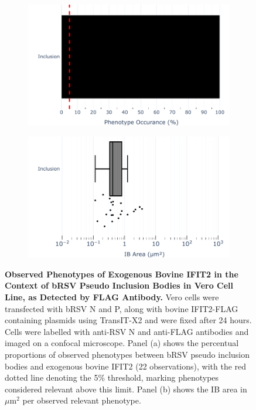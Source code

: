 \begin{figure}
    \begin{subfigure}{0.495\textwidth}
        \caption{}
        \includegraphics[width=1\linewidth]{09. Chapter 4/Figs/01. pIB/03. IFIT2/04. IFIT2-FLAG/03. FLAG/07. bar_bi2f_bnbp.pdf} 
    \end{subfigure}
    \begin{subfigure}{0.495\textwidth}
        \caption{}
        \includegraphics[width=1\linewidth]{09. Chapter 4/Figs/01. pIB/03. IFIT2/04. IFIT2-FLAG/03. FLAG/08. box_bi2f_bnbp.pdf}
    \end{subfigure}
    \caption[Observed Phenotypes of Exogenous Bovine IFIT2 in the Context of bRSV Pseudo Inclusion Bodies in Vero Cell Line, as Detected by FLAG Antibody.]{\textbf{Observed Phenotypes of Exogenous Bovine IFIT2 in the Context of bRSV Pseudo Inclusion Bodies in Vero Cell Line, as Detected by FLAG Antibody.} Vero cells were transfected with bRSV N and P, along with bovine IFIT2-FLAG containing plasmids using TransIT-X2 and were fixed after 24 hours. Cells were labelled with anti-RSV N and anti-FLAG antibodies and imaged on a confocal microscope. Panel (a) shows the percentual proportions of observed phenotypes between bRSV pseudo inclusion bodies and exogenous bovine IFIT2 (22 observations), with the red dotted line denoting the 5\% threshold, marking phenotypes considered relevant above this limit. Panel (b) shows the IB area in \(\mu \mbox{m}^2\) per observed relevant phenotype.}
    \label{fig:Observed Phenotypes of Exogenous Bovine IFIT2 in the Context of bRSV Pseudo Inclusion Bodies in Vero Cell Line, as Detected by FLAG Antibody}
\end{figure}

